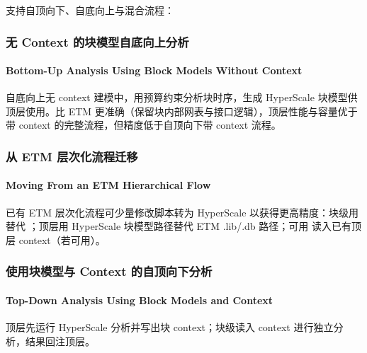 支持自顶向下、自底向上与混合流程：




\subsubsection{无 Context 的块模型自底向上分析}
\paragraph*{Bottom-Up Analysis Using Block Models Without Context}

自底向上无 context 建模中，用预算约束分析块时序，生成 HyperScale 块模型供顶层使用。比 ETM 更准确（保留块内部网表与接口逻辑），顶层性能与容量优于带 context 的完整流程，但精度低于自顶向下带 context 流程。

\subsubsection{从 ETM 层次化流程迁移}
\paragraph*{Moving From an ETM Hierarchical Flow}

已有 ETM 层次化流程可少量修改脚本转为 HyperScale 以获得更高精度：块级用  替代 ；顶层用 HyperScale 块模型路径替代 ETM .lib/.db 路径；可用  读入已有顶层 context（若可用）。

\subsubsection{使用块模型与 Context 的自顶向下分析}
\paragraph*{Top-Down Analysis Using Block Models and Context}

顶层先运行 HyperScale 分析并写出块 context；块级读入 context 进行独立分析，结果回注顶层。


